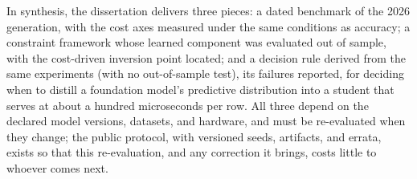 \vspace{1em}

In synthesis, the dissertation delivers three pieces: a dated
benchmark of the 2026 generation, with the cost axes measured under
the same conditions as accuracy; a constraint framework whose
learned component was evaluated
out of sample, with the cost-driven
inversion point located; and a decision rule derived from the same
experiments (with no out-of-sample test), its failures reported,
for deciding when to distill a foundation model's predictive
distribution into a student that serves at about a hundred
microseconds per row. All three depend on the declared model
versions, datasets, and hardware, and must be re-evaluated when
they change; the public protocol, with versioned seeds, artifacts,
and errata, exists so that this re-evaluation, and any correction
it brings, costs little to whoever comes next.
